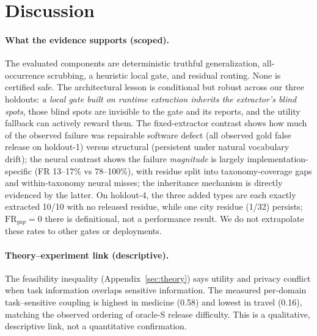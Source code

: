\documentclass[11pt,a4paper]{article}
\begin{document}
\section{Discussion}

\paragraph{What the evidence supports (scoped).} The evaluated components are deterministic truthful generalization, all-occurrence scrubbing, a heuristic local gate, and residual routing. None is certified safe. The architectural lesson is conditional but robust across our three holdouts: \emph{a local gate built on runtime extraction inherits the extractor's blind spots}, those blind spots are invisible to the gate and its reports, and the utility fallback can actively reward them. The fixed-extractor contrast shows how much of the observed failure was repairable software defect (all observed gold false release on holdout-1) versus structural (persistent under natural vocabulary drift); the neural contrast shows the failure \emph{magnitude} is largely implementation-specific (FR 13--17\% vs 78--100\%), with residue split into taxonomy-coverage gaps and within-taxonomy neural misses; the inheritance mechanism is directly evidenced by the latter. On holdout-4, the three added types are each exactly extracted 10/10 with no released residue, while one city residue (1/32) persists; $\mathrm{FR}_{gap}=0$ there is definitional, not a performance result. We do not extrapolate these rates to other gates or deployments.

\paragraph{Theory--experiment link (descriptive).} The feasibility inequality (Appendix~\ref{sec:theory}) says utility and privacy conflict when task information overlaps sensitive information. The measured per-domain task--sensitive coupling is highest in medicine (0.58) and lowest in travel (0.16), matching the observed ordering of oracle-S release difficulty. This is a qualitative, descriptive link, not a quantitative confirmation.
\end{document}
